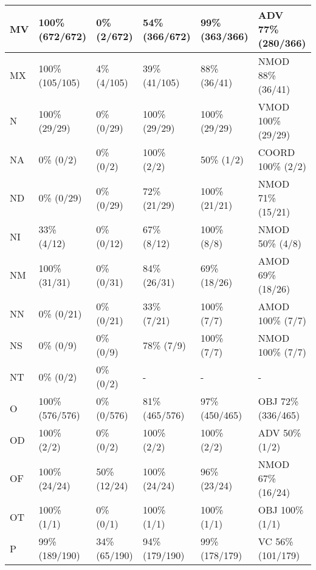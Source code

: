 \begin{small}
\begin{longtable}{|l|l|l|l|l|l|}
\hline
MV & 100\% (672/672) & 0\% (2/672) & 54\% (366/672) & 99\% (363/366) & ADV 77\% (280/366) \\ 
\hline
MX & 100\% (105/105) & 4\% (4/105) & 39\% (41/105) & 88\% (36/41) & NMOD 88\% (36/41) \\ 
\hline
N & 100\% (29/29) & 0\% (0/29) & 100\% (29/29) & 100\% (29/29) & VMOD 100\% (29/29) \\ 
\hline
NA & 0\% (0/2) & 0\% (0/2) & 100\% (2/2) & 50\% (1/2) & COORD 100\% (2/2) \\ 
\hline
ND & 0\% (0/29) & 0\% (0/29) & 72\% (21/29) & 100\% (21/21) & NMOD 71\% (15/21) \\ 
\hline
NI & 33\% (4/12) & 0\% (0/12) & 67\% (8/12) & 100\% (8/8) & NMOD 50\% (4/8) \\ 
\hline
NM & 100\% (31/31) & 0\% (0/31) & 84\% (26/31) & 69\% (18/26) & AMOD 69\% (18/26) \\ 
\hline
NN & 0\% (0/21) & 0\% (0/21) & 33\% (7/21) & 100\% (7/7) & AMOD 100\% (7/7) \\ 
\hline
NS & 0\% (0/9) & 0\% (0/9) & 78\% (7/9) & 100\% (7/7) & NMOD 100\% (7/7) \\ 
\hline
NT & 0\% (0/2) & 0\% (0/2) & - & - & - \\ 
\hline
O & 100\% (576/576) & 0\% (0/576) & 81\% (465/576) & 97\% (450/465) & OBJ 72\% (336/465) \\ 
\hline
OD & 100\% (2/2) & 0\% (0/2) & 100\% (2/2) & 100\% (2/2) & ADV 50\% (1/2) \\ 
\hline
OF & 100\% (24/24) & 50\% (12/24) & 100\% (24/24) & 96\% (23/24) & NMOD 67\% (16/24) \\ 
\hline
OT & 100\% (1/1) & 0\% (0/1) & 100\% (1/1) & 100\% (1/1) & OBJ 100\% (1/1) \\ 
\hline
P & 99\% (189/190) & 34\% (65/190) & 94\% (179/190) & 99\% (178/179) & VC 56\% (101/179) \\ 
\hline
\end{longtable}
\end{small}
